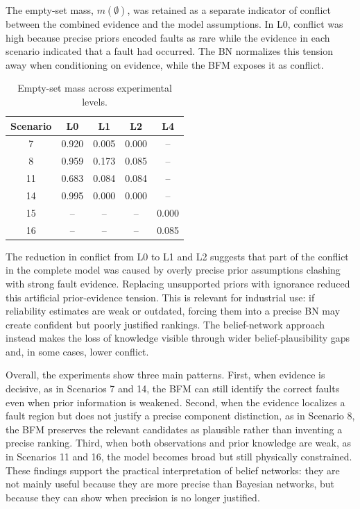 \documentclass[runningheads]{llncs}
\begin{document}
The empty-set mass, $m(\emptyset)$, was retained as a separate indicator of conflict between the combined evidence and the model assumptions. In L0, conflict was high because precise priors encoded faults as rare while the evidence in each scenario indicated that a fault had occurred. The BN normalizes this tension away when conditioning on evidence, while the BFM exposes it as conflict.

\begin{table}[H]
\caption{Empty-set mass across experimental levels.}\label{tab:conflict_results}
\centering
\small
\begin{tabular}{ccccc}
\toprule
Scenario & L0 & L1 & L2 & L4 \\
\midrule
7  & 0.920 & 0.005 & 0.000 & -- \\
8  & 0.959 & 0.173 & 0.085 & -- \\
11 & 0.683 & 0.084 & 0.084 & -- \\
14 & 0.995 & 0.000 & 0.000 & -- \\
15 & --    & --    & --    & 0.000 \\
16 & --    & --    & --    & 0.085 \\
\bottomrule
\end{tabular}
\end{table}

The reduction in conflict from L0 to L1 and L2 suggests that part of the conflict in the complete model was caused by overly precise prior assumptions clashing with strong fault evidence. Replacing unsupported priors with ignorance reduced this artificial prior-evidence tension. This is relevant for industrial use: if reliability estimates are weak or outdated, forcing them into a precise BN may create confident but poorly justified rankings. The belief-network approach instead makes the loss of knowledge visible through wider belief-plausibility gaps and, in some cases, lower conflict.

Overall, the experiments show three main patterns. First, when evidence is decisive, as in Scenarios 7 and 14, the BFM can still identify the correct faults even when prior information is weakened. Second, when the evidence localizes a fault region but does not justify a precise component distinction, as in Scenario 8, the BFM preserves the relevant candidates as plausible rather than inventing a precise ranking. Third, when both observations and prior knowledge are weak, as in Scenarios 11 and 16, the model becomes broad but still physically constrained. These findings support the practical interpretation of belief networks: they are not mainly useful because they are more precise than Bayesian networks, but because they can show when precision is no longer justified.
\end{document}
